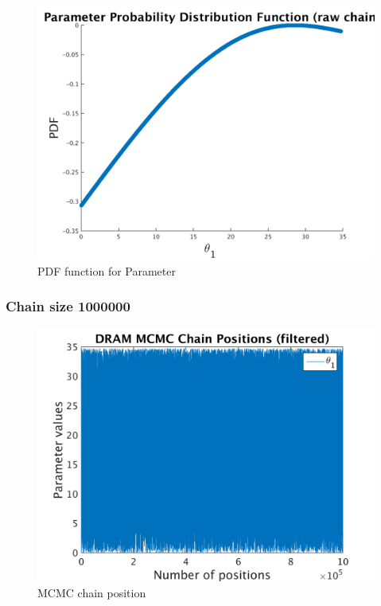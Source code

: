 \begin{figure}[h!]
  
  \centering
   \includegraphics[scale=0.75]{output_900000/ip_logLike_unified}
   \caption{PDF function for Parameter }
\end{figure}


\subsubsection{Chain size 1000000 }

\begin{figure}[h!]
  
  \centering
   \includegraphics[scale=0.75]{output_1000000/simple_ip_chain_pos_filt}
   \caption{MCMC chain position }
\end{figure}



